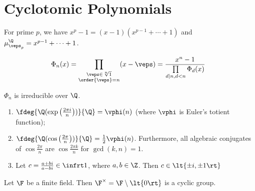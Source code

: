 \documentclass[a4paper]{article}
\begin{document}
\section{Cyclotomic Polynomials}

\begin{ttheorem}
  For prime \( p \), we have \( x^p-1 = (x-1)(x^{p-1} + \cdots + 1) \) and \( \mu_{\veps_p}^\Q = x^{p-1} + \cdots + 1 \).
\end{ttheorem}

\begin{tdefinition}
  \begin{align*}
    \Phi_n(x) = \prod_{\substack{\veps\in\sqrt[n]1\\\order{\veps}=n}} (x-\veps) = \frac{x^n-1}{\prod\limits_{\substack{d\mid n,d<n}}\Phi_d(x)}
  \end{align*}
\end{tdefinition}

\begin{ttheorem}
  \( \Phi_n \) is irreducible over \( \Q \).
\end{ttheorem}

\begin{tcorollary}
  \begin{enumerate}[label=\nf{(\alph*)}]
    \item \( \fdeg{\Q(\exp\left(\frac{2\pi i}{n}\right))}{\Q} = \vphi(n) \) (where \( \vphi \) is Euler's totient function);
    \item \( \fdeg{\Q(\cos\left(\frac{2\pi }{n}\right))}{\Q} = \frac{1}{2}\vphi(n) \).
    Furthermore, all algebraic conjugates of \( \cos \frac{2\pi}{n} \) are \( \cos \frac{2\pi k}{n} \) for \( \gcd(k,n)=1 \).
    \item Let \( c = \frac{a+bi}{a-bi}\in \infrt 1 \), where \( a,b\in \Z \). Then \( c\in \lt\{ \pm i,\pm 1 \rt\} \)
  \end{enumerate}
\end{tcorollary}

\begin{tlemma}
  Let \( \F \) be a finite field. Then \( \F^\times = \F \setminus \lt\{ 0 \rt\} \) is a cyclic group.
\end{tlemma}
\end{document}
